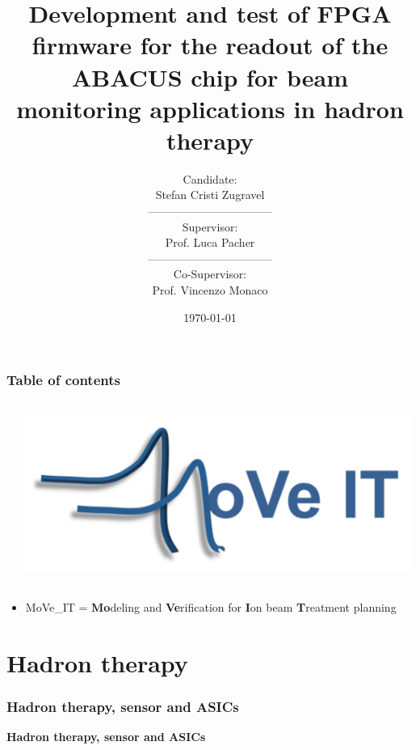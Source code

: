 \documentclass[aspectratio=169]{beamer}
\title{Development and test of FPGA firmware for the readout of the ABACUS chip for beam monitoring applications in hadron therapy}
\author[Stefan Zugravel]{Candidate: \\ Stefan Cristi Zugravel \\ --------------------------------- \\ Supervisor: \\ Prof. Luca Pacher\\ ---------------------------------  \\ Co-Supervisor: \\ Prof. Vincenzo Monaco}
\date{\today}
\institute[UniTo]{University of Turin}
\begin{document}
	
	\begin{frame}		
		\maketitle
	\end{frame}

	\begin{frame}
	\frametitle{Table of contents}
		\begin{columns}
				\begin{center}
					\tableofcontents
				\end{center}
				\begin{center}
					\includegraphics[width=0.95 \textwidth]{IMG/Move_IT_logo.PNG}
				\end{center}
		\end{columns}
	\vspace{1 cm}
	\begin{itemize}
		\item MoVe\_IT = \textbf{Mo}deling and \textbf{Ve}rification for \textbf{I}on beam \textbf{T}reatment planning
	\end{itemize}
	\end{frame}

	\section{Hadron therapy}
	
	\begin{frame}
	\frametitle{Hadron therapy, sensor and ASICs}
	\begin{center}
		{\Huge {}\selectfont \color{blue} \textbf{Hadron therapy, sensor and ASICs}}
	\end{center}
\end{frame}
	
\end{document}
